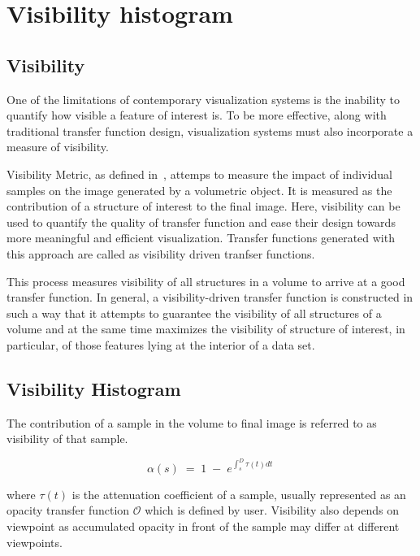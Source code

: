 \section{Visibility histogram}

\subsection{Visibility} 

One of the limitations of contemporary visualization systems is the inability to quantify how visible a feature of interest is. To be more effective, along with traditional transfer function design, visualization systems must also incorporate a measure of visibility. 

Visibility Metric, as defined in~\cite{vdtf}, attemps to measure the impact of individual samples on the image generated by a volumetric object. It is measured as the contribution of a structure of interest to the final image. Here, visibility can be used to quantify the quality of transfer function and ease their design towards more meaningful and efficient visualization. Transfer functions generated with this approach are called as visibility driven tranfser functions.

This process measures visibility of all structures in a volume to arrive at a good transfer function. In general, a visibility-driven transfer function is constructed in such a way that it attempts to guarantee the visibility of all structures of a volume and at the same time maximizes the visibility of structure of interest, in particular, of those features lying at the interior of a data set. 

\subsection{Visibility Histogram}

The contribution of a sample in the volume to final image is referred to as visibility of that sample. 

\begin{equation}
\alpha (s) \; = \; 1 \; - \; e^{\int^{D}_{s} \tau(t) dt \; }  
\end{equation}   


where $ \tau(t) $ is the attenuation coefficient of a sample, usually represented as an opacity transfer function $\mathcal{O}$ which is defined by user. Visibility also depends on viewpoint as accumulated opacity in front of the sample may differ at different viewpoints. 


